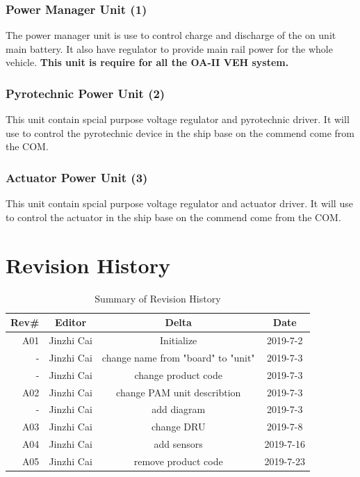 \documentclass[12pt,article]{memoir}
\begin{document}
\subsection{Power Manager Unit (1)}
The power manager unit is use to control charge and discharge of the on unit main battery. It also have regulator to provide main rail power for the whole vehicle. \textbf{This unit is require for all the OA-II VEH system.}
\subsection{Pyrotechnic Power Unit (2)}
This unit contain spcial purpose voltage regulator and pyrotechnic driver. It will use to control the pyrotechnic device in the ship base on the commend come from the COM. 
\subsection{Actuator Power Unit (3)}
This unit contain spcial purpose voltage regulator and actuator driver. It will use to control the actuator in the ship base on the commend come from the COM.
\newpage
\chapter{Revision History}%
\begin{table}[H]
	\centering
	\begin{tabu}{r || c | c | c }
		Rev\# & Editor & Delta & Date\\ \hline
		A01 & Jinzhi Cai & Initialize  & 2019-7-2\\
		- & Jinzhi Cai & change name from "board" to "unit" & 2019-7-3\\
		- & Jinzhi Cai & change product code & 2019-7-3\\ \hline
		A02 & Jinzhi Cai & change PAM unit describtion & 2019-7-3\\
		- & Jinzhi Cai & add diagram & 2019-7-3\\ \hline
		A03 & Jinzhi Cai & change DRU & 2019-7-8\\ \hline
		A04 & Jinzhi Cai & add sensors & 2019-7-16\\ \hline
		A05 & Jinzhi Cai & remove product code & 2019-7-23\\ \hline
	\end{tabu}
	\caption{Summary of Revision History}
	\label{tab:edatools}
\end{table}
\end{document}
